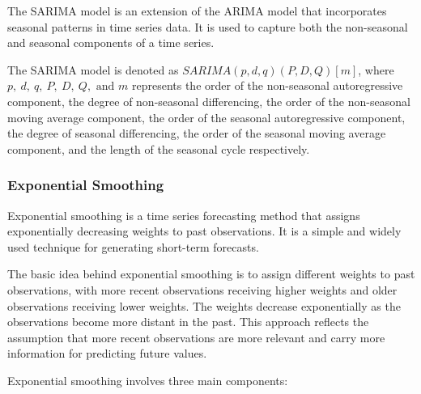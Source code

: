 \documentclass[
]{article}
\begin{document}
The SARIMA model is an extension of the ARIMA model that incorporates
seasonal patterns in time series data. It is used to capture both the
non-seasonal and seasonal components of a time series.

The SARIMA model is denoted as \(SARIMA(p, d, q)(P, D, Q)[m]\), where
\(p,\ d,\ q,\ P,\ D,\ Q, \text{ and }m\) represents the order of the
non-seasonal autoregressive component, the degree of non-seasonal
differencing, the order of the non-seasonal moving average component,
the order of the seasonal autoregressive component, the degree of
seasonal differencing, the order of the seasonal moving average
component, and the length of the seasonal cycle respectively.

\hypertarget{exponential-smoothing}{%
\subsubsection{Exponential Smoothing}\label{exponential-smoothing}}

Exponential smoothing is a time series forecasting method that assigns
exponentially decreasing weights to past observations. It is a simple
and widely used technique for generating short-term forecasts.

The basic idea behind exponential smoothing is to assign different
weights to past observations, with more recent observations receiving
higher weights and older observations receiving lower weights. The
weights decrease exponentially as the observations become more distant
in the past. This approach reflects the assumption that more recent
observations are more relevant and carry more information for predicting
future values.

Exponential smoothing involves three main components:
\end{document}
